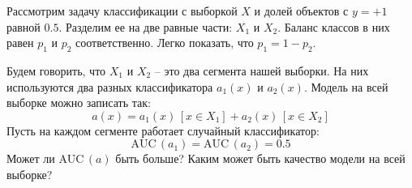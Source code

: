 \documentclass[12pt,a4paper]{article}
\begin{document}
\begin{vkProblem}
	Рассмотрим задачу классификации с выборкой $X$ и долей объектов с $ y = + 1 $ равной $ 0.5 $.
	Разделим ее на две равные части: $ X_1 $ и $ X_2 $.
	Баланс классов в них равен $ p_1 $ и $ p_2 $ соответственно.
	Легко показать, что $ p_1 = 1 - p_2 $.
	
	Будем говорить, что $ X_1 $ и $ X_2 $ – это два сегмента нашей выборки.
	На них используются два разных классификатора $ a_1(x) $ и $ a_2(x) $.
	Модель на всей выборке можно записать так:
	$$
		a(x) = a_1(x)\,\left[x \in X_1\right] + a_2(x)\,\left[x \in X_2\right]
	$$
	Пусть на каждом сегменте работает случайный классификатор:
	$$
		\text{AUC}\,(a_1) = \text{AUC}\,(a_2) = 0.5
	$$
	Может ли $ \text{AUC}\,(a) $ быть больше?
	Каким может быть качество модели на всей выборке?
\end{vkProblem}
\end{document}
